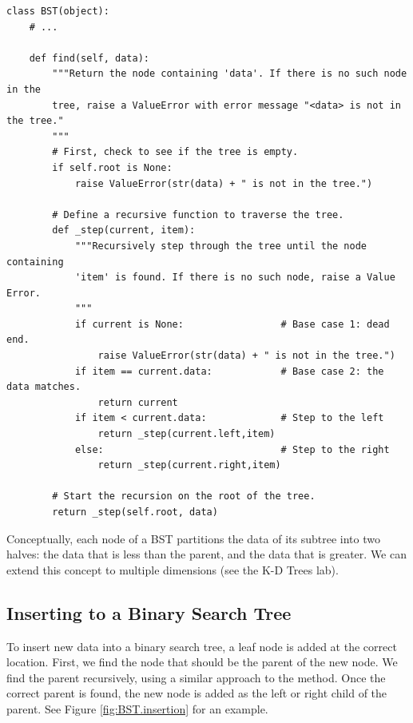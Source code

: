 \begin{lstlisting}
class BST(object):
    # ...

    def find(self, data):
        """Return the node containing 'data'. If there is no such node in the
        tree, raise a ValueError with error message "<data> is not in the tree."
        """
        # First, check to see if the tree is empty.
        if self.root is None:
            raise ValueError(str(data) + " is not in the tree.")
        
        # Define a recursive function to traverse the tree.
        def _step(current, item):
            """Recursively step through the tree until the node containing
            'item' is found. If there is no such node, raise a Value Error.
            """
            if current is None:                 # Base case 1: dead end.
                raise ValueError(str(data) + " is not in the tree.")
            if item == current.data:            # Base case 2: the data matches.
                return current
            if item < current.data:             # Step to the left
                return _step(current.left,item)
            else:                               # Step to the right
                return _step(current.right,item)
        
        # Start the recursion on the root of the tree.
        return _step(self.root, data)
\end{lstlisting}

\begin{info}
Conceptually, each node of a BST partitions the data of its subtree into two halves: the data that is less than the parent, and the data that is greater.
We can extend this concept to multiple dimensions (see the K-D Trees lab).
\end{info}

\subsection*{Inserting to a Binary Search Tree}

To insert new data into a binary search tree, a leaf node is added at the correct location.
First, we find the node that should be the parent of the new node.
We find the parent recursively, using a similar approach to the  method.
Once the correct parent is found, the new node is added as the left or right child of the parent.
See Figure \ref{fig:BST.insertion} for an example.

